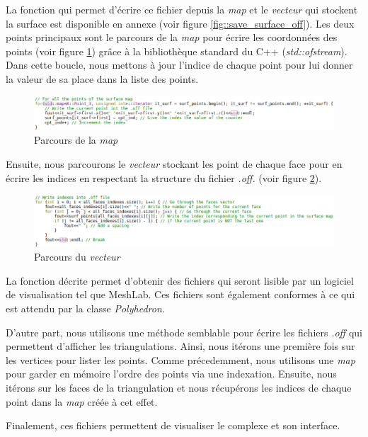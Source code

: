 La fonction qui permet d'écrire ce fichier depuis la \textit{map} et le \textit{vecteur}
qui stockent la surface est disponible en annexe (voir figure \ref{fig::save_surface_off}).
Les deux points principaux sont le parcours de la \textit{map} pour écrire les coordonnées
des points (voir figure \ref{fig::go_map}) grâce à la bibliothèque standard du C++ (\textit{std::ofstream}).
Dans cette boucle, nous mettons à jour l'indice
de chaque point pour lui donner la valeur de sa place dans la liste des points.

\begin{figure}[ht]
\centering
  \includegraphics[width=\textwidth]{figures/go_map.png}
  \caption{Parcours de la \textit{map}}
  \label{fig::go_map}
\end{figure}

Ensuite, nous parcourons le \textit{vecteur} stockant les point de chaque face pour en écrire
les indices en respectant la structure du fichier \textit{.off.} (voir figure \ref{fig::go_vector}).
\begin{figure}[ht]
\centering
  \includegraphics[width=\textwidth]{figures/go_vector.png}
  \caption{Parcours du \textit{vecteur}}
  \label{fig::go_vector}
\end{figure}

La fonction décrite permet d'obtenir des fichiers qui seront lisible par un logiciel de
visualisation tel que MeshLab. Ces fichiers sont également conformes à ce qui est
attendu par la classe \textit{Polyhedron}.

D'autre part, nous utilisons une méthode semblable pour écrire les fichiers \textit{.off}
qui permettent d'afficher les triangulations. Ainsi, nous itérons une première fois
sur les vertices pour lister les points. Comme précedemment, nous utilisons une \textit{map}
pour garder en mémoire l'ordre des points via une indexation. Ensuite, nous itérons sur
les faces de la triangulation et nous récupérons les indices de chaque point dans la
\textit{map} créée à cet effet.


Finalement, ces fichiers permettent de visualiser le complexe et son interface.
